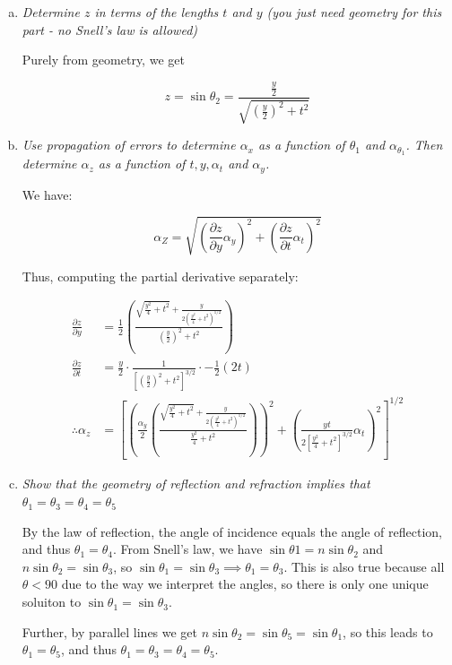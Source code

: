 \documentclass{article}
\theoremstyle{definition}
\numberwithin{equation}{section}
\numberwithin{definition}{section}
\begin{document}
\begin{enumerate}[a)]
\item \textit{Determine $z$ in terms of the lengths $t$ and $y$ (you just need geometry for this part - no Snell's law is allowed)}

Purely from geometry, we get

\[ z = \sin \theta_2 = \frac{\frac{y}{2}}{\sqrt{\left(\frac{y}{2}\right)^2 + t^2}}\]

\item \textit{Use propagation of errors to determine $\alpha_x$ as a function of $\theta_1$ and $\alpha_{\theta_1}$. Then determine $\alpha_z$ as a function of $t, y,\alpha_t$ and $\alpha_y$.} 

We have:

\[ \alpha_Z = \sqrt{\left(\frac{\partial z}{\partial y} \alpha_y\right)^2 + \left(\frac{\partial z}{\partial t} \alpha_t\right)^2}\]

Thus, computing the partial derivative separately:

\begin{align*}
    \frac{\partial z}{\partial y} &= \frac{1}{2}\left(\frac{\sqrt{\frac{y^2}{4} + t^2} + \frac{y}{2\left(\frac{y^2}{4} + t^2\right)^{1/2}}}{\left(\frac{y}{2}\right)^2 + t^2}\right)\\
    \frac{\partial z}{\partial t} &= \frac{y}{2} \cdot \frac{1}{\left[\left(\frac{y}{2}\right)^2 + t^2\right]^{3/2}} \cdot -\frac{1}{2}(2t)\\
    \therefore \alpha_z &= \left[\left(\frac{\alpha_y}{2}\left(\frac{\sqrt{\frac{y^2}{4} + t^2} + \frac{y}{2\left(\frac{y^2}{4} + t^2\right)^{1/2}}}{\frac{y^2}{4} + t^2}\right)\right)^2 + \left(\frac{yt}{2\left[ \frac{y^2}{4} + t^2\right]^{3/2}} \alpha_t \right)^2 \right]^{1/2}
\end{align*}

\item \textit{Show that the geometry of reflection and refraction implies that $\theta_1 = \theta_3 = \theta_4 = \theta_5$}

By the law of reflection, the angle of incidence equals the angle of reflection, and thus $\theta_1 = \theta_4$. From Snell's law, we have $\sin{\theta 1} = n \sin \theta_2$ and $n \sin \theta_2 = \sin{\theta_3}$, so $\sin \theta_1 = \sin \theta_3 \implies \theta_1 = \theta_3$. This is also true because all $\theta < 90$ due to the way we interpret the angles, so there is only one unique soluiton to $\sin \theta_1 = \sin \theta_3$.

Further, by parallel lines we get $n \sin \theta_2 = \sin \theta_5 = \sin \theta_1$, so this leads to $\theta_1 = \theta_5$, and thus $\theta_1 = \theta_3 = \theta_4 = \theta_5$.



\end{enumerate}
\end{document}
